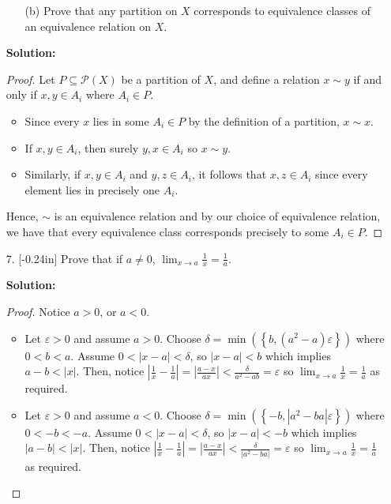 \documentclass[letterpaper,12pt]{article}
\newcommand{\set}[1]{\left\{ #1 \right\}}
\theoremstyle{definition}
\begin{document}
\pagebreak
\begin{enumerate}
    \item[] \begin{enumerate}
        \item[(b)] Prove that any partition on $X$ corresponds to equivalence classes of an equivalence relation on $X$.
    \end{enumerate}
     \begin{mdframed}
            \textbf{Solution:}
            \begin{proof}
                Let $P \subseteq \mathcal{P}(X)$ be a partition of $X$, and define a relation $x \sim y$ if and only if $x,y \in A_i$ where $A_i \in P$. \begin{itemize}
                    \item Since every $x$ lies in some $A_i \in P$ by the definition of a partition, $x \sim x$.
                    \item If $x, y \in A_i$, then surely $y,x \in A_i$ so $x \sim y$.
                    \item Similarly, if $x ,y \in A_i$ and $y,z \in A_i$, it follows that $x , z \in A_i$ since every element lies in precisely one $A_i$.
                \end{itemize}
                Hence, $\sim$ is an equivalence relation and by our choice of equivalence relation, we have that every equivalence class corresponds precisely to some $A_i \in P$.
            \end{proof}
        \end{mdframed}
\end{enumerate}
\pagebreak
\begin{enumerate}
    \item[7.] \reversemarginpar{}[-0.24in] Prove that if $a \neq 0$, $\lim_{x \rightarrow a} \frac{1}{x} = \frac{1}{a}$.
     \begin{mdframed}
            \textbf{Solution:}
            \begin{proof}
            Notice $a > 0$, or $a<0$.
            \begin{itemize}
                \item Let $\varepsilon > 0$ and assume $a>0$. Choose $\delta = \min(\set{b,(a^2-a)\varepsilon})$ where $0 < b < a$. Assume $0 < |x-a| < \delta$, so $|x-a| < b$ which implies $a-b < |x|$. Then, notice $\left | \frac{1}{x} - \frac{1}{a}\right | = \left |\frac{a-x}{ax} \right | < \frac{\delta}{a^2-ab} = \varepsilon$ so $\lim_{x \rightarrow a} \frac{1}{x} = \frac{1}{a}$ as required.
                \item Let $\varepsilon > 0$ and assume $a<0$. Choose $\delta = \min(\set{-b,|a^2 - ba|\varepsilon})$ where $0 < -b < -a$. Assume $0 < |x-a| < \delta$, so $|x-a| < -b$ which implies $|a-b| < |x|$. Then, notice $\left | \frac{1}{x} - \frac{1}{a}\right | = \left |\frac{a-x}{ax} \right | < \frac{\delta}{|a^2 - ba|} = \varepsilon$ so $\lim_{x \rightarrow a} \frac{1}{x} = \frac{1}{a}$ as required.
            \end{itemize}
            \end{proof}
        \end{mdframed}
\end{enumerate}
\end{document}
